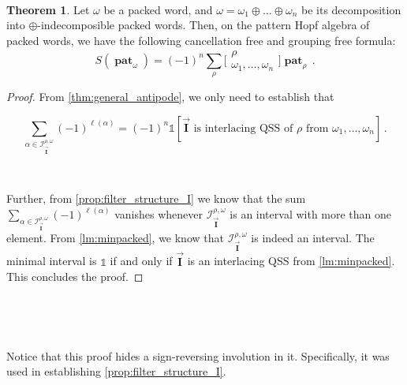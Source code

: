 \documentclass[12pt, reqno]{amsart}
\theoremstyle{definition}
\newtheorem{thm}{Theorem}[section]
\newcommand{\III}{\vec{\mathbf{I}}}
\DeclareMathOperator{\pat}{\mathbf{pat}}
\begin{document}
\

\begin{thm}\label{thm:antipode_packed}
Let $\omega $ be a packed word, and $\omega = \omega_1 \oplus \dots \oplus \omega_n$ be its decomposition into $\oplus$-indecomposible packed words.
Then, on the pattern Hopf algebra of packed words, we have the following cancellation free and grouping free formula:
$$S(\pat_{\omega}) = (-1)^n  \sum_{\rho} \bigl[\!\begin{smallmatrix} \rho  \\ \omega_1, \dots, \omega_n \end{smallmatrix}\!\bigr] \pat_{\rho}  \, .$$
\end{thm}


\begin{proof}
From \cref{thm:general_antipode}, we only need to establish that

\begin{equation}\label{eq:packed_alternating_sum}
\sum_{\alpha\in \mathcal I^{\rho, \omega}_{\III}} (-1)^{\ell (\alpha)} = (-1)^n \mathbb{1}[\III \text{ is interlacing QSS of $\rho$ from } \omega_1, \dots, \omega_n]\, .      
\end{equation}

\

Further, from \cref{prop:filter_structure_I} we know that the sum $\sum_{\alpha\in \mathcal I^{\rho, \omega}_{\III}}  (-1)^{\ell (\alpha)} $ vanishes whenever $\mathcal I^{\rho, \omega}_{\III}$ is an interval with more than one element.
From \cref{lm:minpacked}, we know that $\mathcal I^{\rho, \omega}_{\III}$ is indeed an interval.
The minimal interval is $\mathbb{1}$ if and only if $\III$ is an interlacing QSS from \cref{lm:minpacked}.
This concludes the proof.
\end{proof}

\



\

Notice that this proof hides a sign-reversing involution in it.
Specifically, it was used in establishing \cref{prop:filter_structure_I}.
\end{document}
